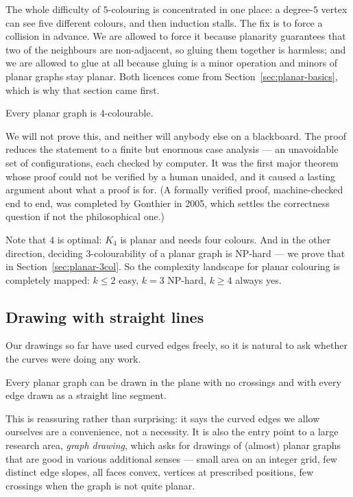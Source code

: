 \begin{intuition}
The whole difficulty of $5$-colouring is concentrated in one place: a
degree-$5$ vertex can see five different colours, and then induction stalls.
The fix is to force a collision in advance. We are allowed to force it because
planarity guarantees that two of the neighbours are non-adjacent, so gluing
them together is harmless; and we are allowed to glue at all because gluing is
a minor operation and minors of planar graphs stay planar. Both licences come
from Section~\ref{sec:planar-basics}, which is why that section came first.
\end{intuition}

\begin{theorem}
Every planar graph is $4$-colourable.
\end{theorem}

We will not prove this, and neither will anybody else on a blackboard. The
proof reduces the statement to a finite but enormous case analysis --- an
unavoidable set of configurations, each checked by computer. It was the first
major theorem whose proof could not be verified by a human unaided, and it
caused a lasting argument about what a proof is for. (A formally verified
proof, machine-checked end to end, was completed by Gonthier in 2005, which
settles the correctness question if not the philosophical one.)

Note that $4$ is optimal: $K_4$ is planar and needs four colours. And in the
other direction, deciding $3$-colourability of a planar graph is NP-hard ---
we prove that in Section~\ref{sec:planar-3col}. So the complexity landscape for
planar colouring is completely mapped: $k \le 2$ easy, $k = 3$ NP-hard,
$k \ge 4$ always yes.

\subsection{Drawing with straight lines}\label{sec:planar-fary}

Our drawings so far have used curved edges freely, so it is natural to ask
whether the curves were doing any work.

\begin{theorem}[Fáry, 1936]
Every planar graph can be drawn in the plane with no crossings and with every
edge drawn as a straight line segment.
\end{theorem}

This is reassuring rather than surprising: it says the curved edges we allow
ourselves are a convenience, not a necessity. It is also the entry point to a
large research area, \emph{graph drawing}, which asks for drawings of (almost)
planar graphs that are good in various additional senses --- small area on an
integer grid, few distinct edge slopes, all faces convex, vertices at
prescribed positions, few crossings when the graph is not quite planar.

